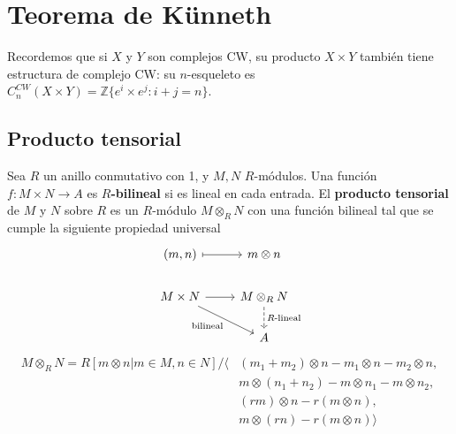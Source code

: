 \documentclass[spanish]{book}
\theoremstyle{definition}
\newcommand{\Z}{\mathbb{Z}}
\begin{document}
\section{Teorema de Künneth}
Recordemos que si $X$ y $Y$ son complejos CW, su producto $X\times Y$ también tiene estructura de complejo CW: su $n$-esqueleto es $C^{CW}_n(X\times Y)=\Z\{e^i\times e^j:i+j=n\}$.

\subsection{Producto tensorial}
Sea $R$ un anillo conmutativo con 1, y $M,N$ $R$-módulos. Una función $f:M\times N\to A$ es \textbf{$R$-bilineal} si es lineal en cada entrada. El \textbf{producto tensorial} de $M$ y $N$ sobre $R$ es un $R$-módulo $M\otimes_RN$ con una función bilineal tal que se cumple la siguiente propiedad universal
\[\begin{tikzcd}
	(m,n)\arrow[r,maps to]&m\otimes n\\
	M\times N\arrow[r]\arrow[rd,swap,"\text{bilineal}"]&M\otimes_RN\arrow[d,dashed,"R\text{-lineal}"]\\
	&A
\end{tikzcd}\]
\begin{align*}
	M\otimes_RN=R[m\otimes n|m\in M,n\in N]\Big/\Big\langle &(m_1+m_2)\otimes n-m_1\otimes n-m_2\otimes n,\\
	&m\otimes(n_1+n_2)-m\otimes n_1-m\otimes n_2,\\
	&(rm)\otimes n-r(m\otimes n),\\
	&m\otimes(rn)-r(m\otimes n)\Big\rangle
\end{align*}
\end{document}
